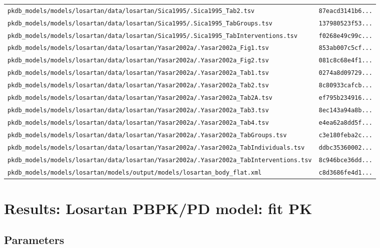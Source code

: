 \begin{longtable}{ll}
\texttt{pkdb\_models/models/losartan/data/losartan/Sica1995/.Sica1995\_Tab2.tsv} & \texttt{87eacd3141b6...} \\
\texttt{pkdb\_models/models/losartan/data/losartan/Sica1995/.Sica1995\_TabGroups.tsv} & \texttt{137980523f53...} \\
\texttt{pkdb\_models/models/losartan/data/losartan/Sica1995/.Sica1995\_TabInterventions.tsv} & \texttt{f0268e49c99c...} \\
\texttt{pkdb\_models/models/losartan/data/losartan/Yasar2002a/.Yasar2002a\_Fig1.tsv} & \texttt{853ab007c5cf...} \\
\texttt{pkdb\_models/models/losartan/data/losartan/Yasar2002a/.Yasar2002a\_Fig2.tsv} & \texttt{081c8c68e4f1...} \\
\texttt{pkdb\_models/models/losartan/data/losartan/Yasar2002a/.Yasar2002a\_Tab1.tsv} & \texttt{0274a8d09729...} \\
\texttt{pkdb\_models/models/losartan/data/losartan/Yasar2002a/.Yasar2002a\_Tab2.tsv} & \texttt{8c80933cafcb...} \\
\texttt{pkdb\_models/models/losartan/data/losartan/Yasar2002a/.Yasar2002a\_Tab2A.tsv} & \texttt{ef795b234916...} \\
\texttt{pkdb\_models/models/losartan/data/losartan/Yasar2002a/.Yasar2002a\_Tab3.tsv} & \texttt{8ec143a94a8b...} \\
\texttt{pkdb\_models/models/losartan/data/losartan/Yasar2002a/.Yasar2002a\_Tab4.tsv} & \texttt{e4ea62a8dd5f...} \\
\texttt{pkdb\_models/models/losartan/data/losartan/Yasar2002a/.Yasar2002a\_TabGroups.tsv} & \texttt{c3e180feba2c...} \\
\texttt{pkdb\_models/models/losartan/data/losartan/Yasar2002a/.Yasar2002a\_TabIndividuals.tsv} & \texttt{ddbc35360002...} \\
\texttt{pkdb\_models/models/losartan/data/losartan/Yasar2002a/.Yasar2002a\_TabInterventions.tsv} & \texttt{8c946bce36dd...} \\
\texttt{pkdb\_models/models/losartan/models/output/models/losartan\_body\_flat.xml} & \texttt{c8d3686fe4d1...} \\
\end{longtable}

\section{Results: Losartan PBPK/PD model: fit PK}

\subsection{Parameters}

